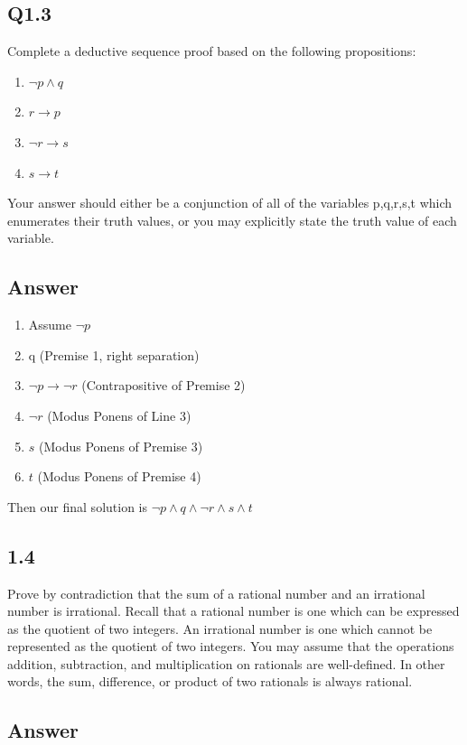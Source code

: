 \documentclass{article}
\begin{document}
\subsection*{Q1.3}

Complete a deductive sequence proof based on the following propositions:
\begin{enumerate}
    \item $\lnot p \land q$
    \item $r \rightarrow p$
    \item $\lnot r \rightarrow s$
    \item $s \rightarrow t$
\end{enumerate}
Your answer should either be a conjunction of all of the variables p,q,r,s,t which enumerates their
truth values, or you may explicitly state the truth value of each variable.
\subsection*{Answer}
\begin{enumerate}
    \item Assume $\lnot p$
    \item q (Premise 1, right separation)
    \item $\lnot p \rightarrow \lnot r$ (Contrapositive of Premise 2)
    \item $\lnot r$ (Modus Ponens of Line 3)
    \item $s$ (Modus Ponens of Premise 3)
    \item $t$ (Modus Ponens of Premise 4)
\end{enumerate}

Then our final solution is $\lnot p \land q \land \lnot r \land s \land t$
\newpage
\subsection*{1.4}
Prove by contradiction that the sum of a rational number and an irrational number is irrational. Recall that a rational number is one
which can be expressed as the quotient of two integers. An irrational number is one which cannot be represented as the quotient of two integers.
You may assume that the operations addition, subtraction, and multiplication on rationals are well-defined. In other words, the sum, difference, or
product of two rationals is always rational.
\subsection*{Answer}
\end{document}
